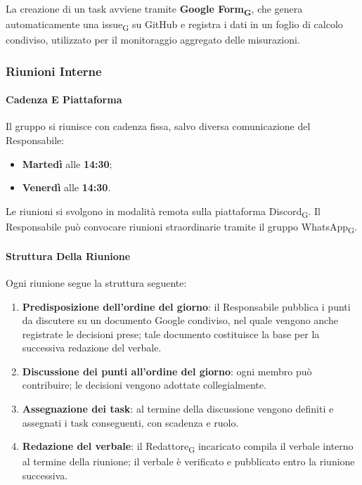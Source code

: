 La creazione di un task avviene tramite \textbf{Google Form\textsubscript{G}}, che genera
automaticamente una issue\textsubscript{G} su GitHub e registra i dati in un
foglio di calcolo condiviso, utilizzato per il monitoraggio aggregato delle
misurazioni.
 
\subsubsection{Riunioni Interne}
 
\paragraph{Cadenza E Piattaforma}
Il gruppo si riunisce con cadenza fissa, salvo diversa comunicazione del
Responsabile:
 
\begin{itemize}
  \item \textbf{Martedì} alle \textbf{14:30};
  \item \textbf{Venerdì} alle \textbf{14:30}.
\end{itemize}
 
Le riunioni si svolgono in modalità remota sulla piattaforma Discord\textsubscript{G}.
Il Responsabile può convocare riunioni straordinarie tramite il gruppo
WhatsApp\textsubscript{G}.
 
\paragraph{Struttura Della Riunione}
Ogni riunione segue la struttura seguente:
 
\begin{enumerate}
  \item \textbf{Predisposizione dell'ordine del giorno}: il Responsabile pubblica
        i punti da discutere su un documento Google condiviso, nel quale vengono
        anche registrate le decisioni prese; tale documento costituisce la base
        per la successiva redazione del verbale.
  \item \textbf{Discussione dei punti all'ordine del giorno}: ogni membro può
        contribuire; le decisioni vengono adottate collegialmente.
  \item \textbf{Assegnazione dei task}: al termine della discussione vengono
        definiti e assegnati i task conseguenti, con scadenza e ruolo.
  \item \textbf{Redazione del verbale}: il Redattore\textsubscript{G} incaricato compila il verbale
        interno al termine della riunione; il verbale è verificato e pubblicato
        entro la riunione successiva.
\end{enumerate}
 

